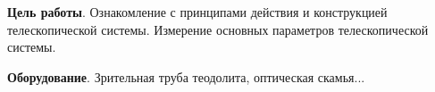 \textbf{Цель работы}. Ознакомление с принципами действия и конструкцией телескопической системы. Измерение основных параметров телескопической системы.

\textbf{Оборудование}. Зрительная труба теодолита, оптическая скамья...